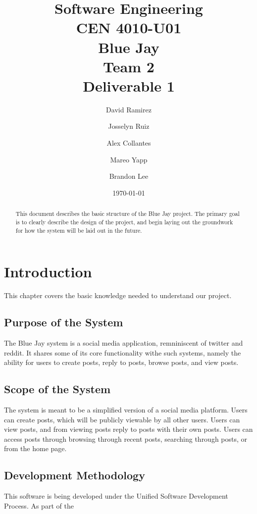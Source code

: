 \documentclass[letter,12pt]{report}
\begin{document}
\title{Software Engineering\\CEN 4010-U01\\Blue Jay\\Team 2\\Deliverable 1}
\author{David Ramirez\and Josselyn Ruiz\and Alex Collantes\and Mareo Yapp\and Brandon Lee}
\date{\today}
\maketitle

\tableofcontents

\begin{abstract}
This document describes the basic structure of the Blue Jay project.
The primary goal is to clearly describe the design of the project,
and begin laying out the groundwork for how the system will be laid out
in the future.
\end{abstract}



\chapter{Introduction}
This chapter covers the basic knowledge needed to understand our project.

\section{Purpose of the System}
The Blue Jay system is a social media application,
remniniscent of twitter and reddit. It shares some of its
core functionality withe such systems, namely the ability for users
to create posts, reply to posts, browse posts, and view posts.


\section{Scope of the System}
The system is meant to be a simplified version of a social media platform.
Users can create posts, which will be publicly viewable by all other users.
Users can view posts, and from viewing posts reply to posts with their own
posts.
Users can access posts through browsing through recent posts, searching
through posts, or from the home page.



\section{Development Methodology}
This software is being developed under the Unified Software Development Process.
As part of the 
\end{document}
